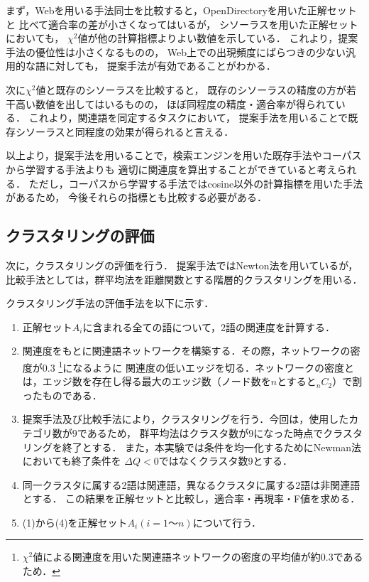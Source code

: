 \documentclass[japanese]{jnlp_1.3a}
\begin{document}
まず，Webを用いる手法同士を比較すると，OpenDirectoryを用いた正解セットと
比べて適合率の差が小さくなってはいるが，
シソーラスを用いた正解セットにおいても，
$\chi^2$値が他の計算指標よりよい数値を示している．
これより，提案手法の優位性は小さくなるものの，
Web上での出現頻度にばらつきの少ない汎用的な語に対しても，
提案手法が有効であることがわかる．


次に$\chi^2$値と既存のシソーラスを比較すると，
既存のシソーラスの精度の方が若干高い数値を出してはいるものの，
ほぼ同程度の精度・適合率が得られている．
これより，関連語を同定するタスクにおいて，
提案手法を用いることで既存シソーラスと同程度の効果が得られると言える．

以上より，提案手法を用いることで，検索エンジンを用いた既存手法やコーパスから学習する手法よりも
適切に関連度を算出することができていると考えられる．
ただし，コーパスから学習する手法ではcosine以外の計算指標を用いた手法があるため，
今後それらの指標とも比較する必要がある．


\subsection{クラスタリングの評価}

次に，クラスタリングの評価を行う．
提案手法ではNewton法を用いているが，
比較手法としては，群平均法を距離関数とする階層的クラスタリングを用いる．

クラスタリング手法の評価手法を以下に示す．

\begin{enumerate}
\item 正解セット$A_i$に含まれる全ての語について，2語の関連度を計算する．
\item 関連度をもとに関連語ネットワークを構築する．その際，ネットワークの密度が$0.3$
\footnote{$\chi^2$値による関連度を用いた関連語ネットワークの密度の平均値が約$0.3$であるため．}になるように
関連度の低いエッジを切る．ネットワークの密度とは，エッジ数を存在し得る最大のエッジ数（ノード数を$n$とすると$_n C_2$）で割ったものである\cite{Scott00}．
\item 提案手法及び比較手法により，クラスタリングを行う．今回は，使用したカテゴリ数が$9$であるため，
群平均法はクラスタ数が$9$になった時点でクラスタリングを終了とする．
また，本実験では条件を均一化するためにNewman法においても終了条件を
    $\Delta Q < 0$ではなくクラスタ数9とする．
\item 同一クラスタに属する2語は関連語，異なるクラスタに属する2語は非関連語とする．
この結果を正解セットと比較し，適合率・再現率・F値を求める．
\item (1)から(4)を正解セット$A_i(i=1〜n)$について行う．
\end{enumerate}
\end{document}
